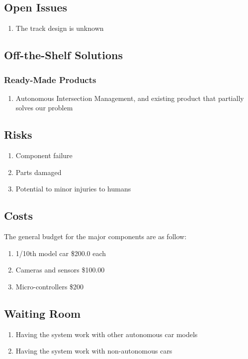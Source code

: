 \documentclass [11pt]{article}
\begin{document}
\subsection{Open Issues}
	\begin{enumerate}[label=\textbf{\Alph*}:]
		\item The track design is unknown
	\end{enumerate}

\subsection{Off-the-Shelf Solutions}

\subsubsection{Ready-Made Products}
	\begin{enumerate}[label=\textbf{\Alph*}:]
		\item Autonomous Intersection Management, and existing product that partially solves our problem
	\end{enumerate}


\subsection{Risks}
	\begin{enumerate}[label=\textbf{\Alph*}:]
		\item Component failure
		\item Parts damaged
		\item Potential to minor injuries to humans
	\end{enumerate}
	

	
\subsection{Costs}	
		
		The general budget for the major components are as follow:

		\begin{enumerate}[label=\textbf{\Alph*}:]
			\item 1/10th model car \$200.0 each
			\item Cameras and sensors \$100.00
			\item Micro-controllers \$200  
		\end{enumerate}


\subsection{Waiting Room}
	\begin{enumerate}[label=\textbf{\Alph*}:]
		\item Having the system work with other autonomous car models
		\item Having the system work with non-autonomous cars
	\end{enumerate} 
\end{document}
